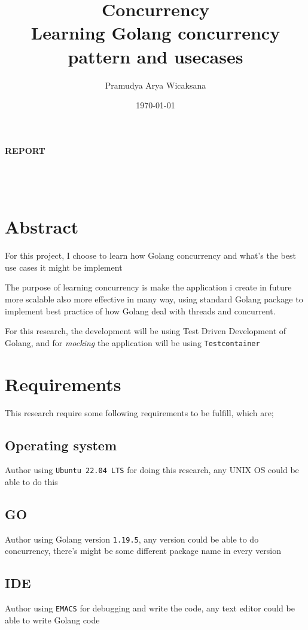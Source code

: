\documentclass[a4paper,12pt]{report}
\author{Pramudya Arya Wicaksana}
\date{\today}
\title{Concurrency\\\medskip
\large Learning Golang concurrency pattern and usecases}
\makeatletter
\renewcommand{\maketitle}{
    \begin{titlepage}
      \begin{center}
        \vspace*{2em}
        \Huge \textbf{REPORT} \\
        \vspace{4em}
        \Huge \textbf{\@title} \\
        \vspace{4em}
        \Large \textbf{\@date} \\
        \bigskip
        \Large \textbf{\@author} \\
        \medskip
      \end{center}
    \end{titlepage}
  }
\makeatother
\begin{document}
\maketitle
\tableofcontents



\chapter{Abstract}
\label{sec:org66742dd}

For this project, I choose to learn how Golang concurrency and what's the best use cases it might be implement

The purpose of learning concurrency is make the application i create in future more scalable also more effective in many way, using standard Golang package to implement best practice of how Golang deal with threads and concurrent.

For this research, the development will be using Test Driven Development of Golang, and for \emph{mocking} the application will be using \texttt{Testcontainer}

\chapter{Requirements}
\label{sec:org8b07758}

This research require some following requirements to be fulfill, which are;

\section{Operating system}
\label{sec:org64b3c36}

Author using \texttt{Ubuntu 22.04 LTS} for doing this research, any UNIX OS could be able to do this

\section{GO}
\label{sec:org59e14b7}

Author using Golang version \texttt{1.19.5}, any version could be able to do concurrency, there's might be some different package name in every version

\section{IDE}
\label{sec:orgcebef4d}

Author using \texttt{EMACS} for debugging and write the code, any text editor could be able to write Golang code
\end{document}
